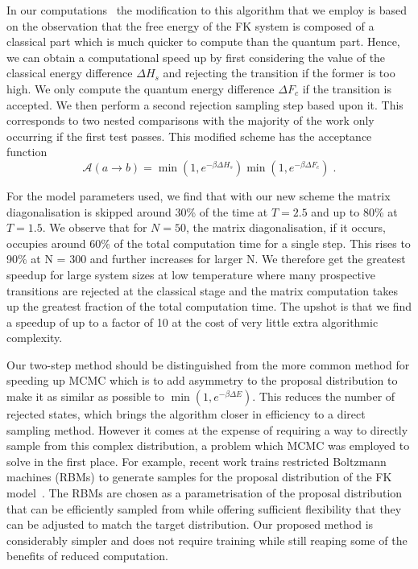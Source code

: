 In our computations~\autocite{hodsonMCMCFKModel2021} the modification to this algorithm that we employ is based on the observation that the free energy of the FK system is composed of a classical part which is much quicker to compute than the quantum part. Hence, we can obtain a computational speed up by first considering the value of the classical energy difference \(\Delta H_s\) and rejecting the transition if the former is too high. We only compute the quantum energy difference \(\Delta F_c\) if the transition is accepted. We then perform a second rejection sampling step based upon it. This corresponds to two nested comparisons with the majority of the work only occurring if the first test passes. This modified scheme has the acceptance function \[\mathcal{A}(a \to b) = \min\left(1, e^{-\beta \Delta H_s}\right)\min\left(1, e^{-\beta \Delta F_c}\right)\;.\]

For the model parameters used, we find that with our new scheme the matrix diagonalisation is skipped around 30\% of the time at \(T = 2.5\) and up to 80\% at \(T = 1.5\). We observe that for \(N = 50\), the matrix diagonalisation, if it occurs, occupies around 60\% of the total computation time for a single step. This rises to 90\% at N = 300 and further increases for larger N. We therefore get the greatest speedup for large system sizes at low temperature where many prospective transitions are rejected at the classical stage and the matrix computation takes up the greatest fraction of the total computation time. The upshot is that we find a speedup of up to a factor of 10 at the cost of very little extra algorithmic complexity.

Our two-step method should be distinguished from the more common method for speeding up MCMC which is to add asymmetry to the proposal distribution to make it as similar as possible to \(\min\left(1, e^{-\beta \Delta E}\right)\). This reduces the number of rejected states, which brings the algorithm closer in efficiency to a direct sampling method. However it comes at the expense of requiring a way to directly sample from this complex distribution, a problem which MCMC was employed to solve in the first place. For example, recent work trains restricted Boltzmann machines (RBMs) to generate samples for the proposal distribution of the FK model~\autocite{huangAcceleratedMonteCarlo2017}. The RBMs are chosen as a parametrisation of the proposal distribution that can be efficiently sampled from while offering sufficient flexibility that they can be adjusted to match the target distribution. Our proposed method is considerably simpler and does not require training while still reaping some of the benefits of reduced computation.

